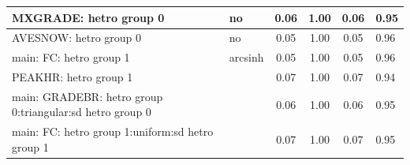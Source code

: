 \begin{table}
\begin{center}
\begin{tabular}{|l|l|c|c|c|l|}
			\hline
			MXGRADE: hetro group 0 & no & 0.06 & 1.00 & 0.06 & 0.95 \\
			\hline
			AVESNOW: hetro group 0 & no & 0.05 & 1.00 & 0.05 & 0.96 \\
			\hline
			main: FC: hetro group 1 & arcsinh & 0.05 & 1.00 & 0.05 & 0.96 \\
			\hline
			PEAKHR: hetro group 1 &  & 0.07 & 1.00 & 0.07 & 0.94 \\
			\hline
			main: GRADEBR: hetro group 0:triangular:sd  hetro group 0 &  & 0.06 & 1.00 & 0.06 & 0.95 \\
			\hline
			main: FC: hetro group 1:uniform:sd  hetro group 1 &  & 0.07 & 1.00 & 0.07 & 0.95 \\
			\hline
		\end{tabular}
	\end{center}
\end{table}